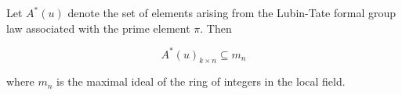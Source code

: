 Let $A^*(u)$ denote the set of elements arising from the Lubin-Tate formal group law associated with the prime element $\pi$. Then

$$
A^*(u)_{k \times n} \subseteq m_n
$$

where $m_n$ is the maximal ideal of the ring of integers in the local field.
